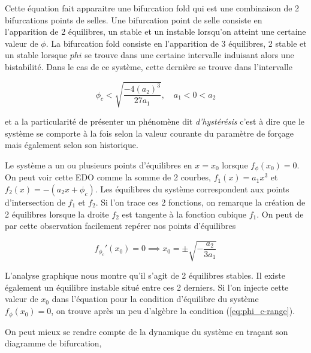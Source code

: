 Cette équation fait apparaitre une bifurcation fold qui est une combinaison de 2 bifurcations points de selles. Une bifurcation point de selle consiste en l'apparition de 2 équilibres, un stable et un instable lorsqu'on atteint une certaine valeur de $\phi$. La bifurcation fold consiste en l'apparition de 3 équilibres, 2 stable et un stable lorsque $phi$ se trouve dans une certaine intervalle induisant alors une bistabilité. Dans le cas de ce système, cette dernière se trouve dans l'intervalle

\begin{equation} \label{eq:phi_c-range}
  \phi_c < \sqrt{\frac{-4(a_2)^3}{27a_1}}, \quad a_1 < 0 < a_2
\end{equation}

et a la particularité de présenter un phénomène dit \emph{d'hystérésis} c'est à dire que le système se comporte à la fois selon la valeur courante du paramètre de forçage mais également selon son historique.


Le système a un ou plusieurs points d'équilibres en $x = x_0$ lorsque $f_{\phi}(x_0) = 0$. On peut voir cette EDO comme la somme de 2 courbes, $f_1(x) = a_1 x^3$ et $f_2(x) = - (a_2x + \phi_c)$. Les équilibres du système correspondent aux points d'intersection de $f_1$ et $f_2$. Si l'on trace ces 2 fonctions, on remarque la création de 2 équilibres lorsque la droite $f_2$ est tangente à la fonction cubique $f_1$. On peut de par cette observation facilement repérer nos points d'équilibres

\begin{equation}
  f_{\phi_c}'(x_0) = 0 \implies x_0 = \pm \sqrt{-\frac{a_2}{3a_1}}
\end{equation}

L'analyse graphique nous montre qu'il s'agit de 2 équilibres stables. Il existe également un équilibre instable situé entre ces 2 derniers.
Si l'on injecte cette valeur de $x_0$ dans l'équation pour la condition d'équilibre du système $f_{\phi}(x_0) = 0$, on trouve après un peu d'algèbre la condition (\ref{eq:phi_c-range}).


On peut mieux se rendre compte de la dynamique du système en traçant son diagramme de bifurcation,


